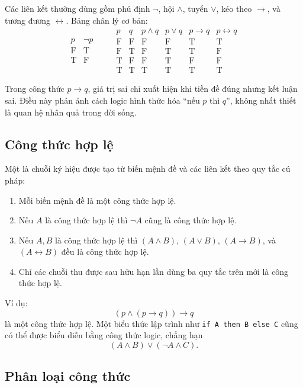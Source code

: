 \documentclass[11pt]{article}
\newcommand{\True}{\mathrm{T}}
\newcommand{\False}{\mathrm{F}}
\begin{document}
Các liên kết thường dùng gồm phủ định \(\neg\), hội \(\land\), tuyển
\(\lor\), kéo theo \(\to\), và tương đương \(\leftrightarrow\). Bảng chân lý
cơ bản:
\[
\begin{array}{c|c}
p & \neg p\\ \hline
\False & \True\\
\True & \False
\end{array}
\qquad
\begin{array}{c|c|c|c|c|c}
p&q&p\land q&p\lor q&p\to q&p\leftrightarrow q\\ \hline
\False&\False&\False&\False&\True&\True\\
\False&\True&\False&\True&\True&\False\\
\True&\False&\False&\True&\False&\False\\
\True&\True&\True&\True&\True&\True
\end{array}
\]

Trong công thức \(p\to q\), giá trị sai chỉ xuất hiện khi tiền đề đúng nhưng
kết luận sai. Điều này phản ánh cách logic hình thức hóa ``nếu \(p\) thì
\(q\)'', không nhất thiết là quan hệ nhân quả trong đời sống.

\subsection{Công thức hợp lệ}

Một  là chuỗi ký hiệu được tạo từ biến mệnh đề và các
liên kết theo quy tắc cú pháp:
\begin{enumerate}
  \item Mỗi biến mệnh đề là một công thức hợp lệ.
  \item Nếu \(A\) là công thức hợp lệ thì \(\neg A\) cũng là công thức hợp lệ.
  \item Nếu \(A,B\) là công thức hợp lệ thì
  \((A\land B)\), \((A\lor B)\), \((A\to B)\), và
  \((A\leftrightarrow B)\) đều là công thức hợp lệ.
  \item Chỉ các chuỗi thu được sau hữu hạn lần dùng ba quy tắc trên mới là
  công thức hợp lệ.
\end{enumerate}

Ví dụ:
\[
  (p\land(p\to q))\to q
\]
là một công thức hợp lệ. Một biểu thức lập trình như
\texttt{if A then B else C} cũng có thể được biểu diễn bằng công thức logic,
chẳng hạn
\[
  (A\land B)\lor(\neg A\land C).
\]

\subsection{Phân loại công thức}
\end{document}
